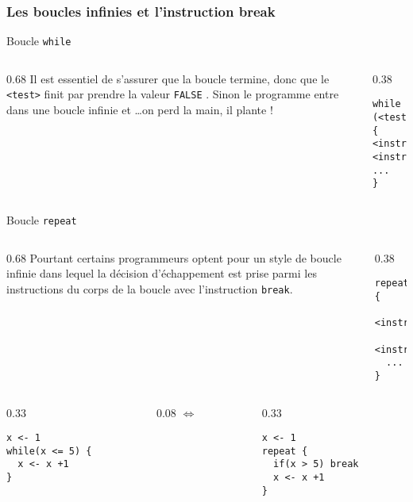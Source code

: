 \documentclass[10pt]{beamer}
\begin{document}
\begin{frame}[fragile]
  \frametitle{Les boucles infinies et l'instruction break}
  
  \begin{block}{Boucle \texttt{while}}
\begin{columns}[c]
\begin{column}{0.68\textwidth}
    Il est essentiel de s'assurer que la boucle termine, donc que le \texttt{<test>} finit par prendre la valeur \texttt{FALSE} .
  Sinon le programme entre dans une \alert{boucle infinie} et \dots on perd la main, il plante !

\end{column}
\begin{column}{0.38\textwidth}
  \begin{lstlisting}[style=editor]
while (<test>) {
<instruction>
<instruction>
...
}    
  \end{lstlisting}
\end{column}
\end{columns}
\end{block}

  \begin{block}{Boucle \texttt{repeat}}
\begin{columns}[c]
\begin{column}{0.68\textwidth}
  Pourtant certains programmeurs optent pour un style de boucle infinie dans lequel la décision d'échappement est prise parmi les instructions du corps de la boucle avec l'instruction \texttt{break}.
\end{column}
\begin{column}{0.38\textwidth}
  \begin{lstlisting}[style=editor]
repeat {
  <instruction>
  <instruction>
  ...
}    
  \end{lstlisting}
\end{column}
\end{columns}

  \end{block}
\begin{columns}[c]
\begin{column}{0.33\textwidth}
  \begin{lstlisting}[style=editor]
x <- 1
while(x <= 5) {
  x <- x +1
}    
\end{lstlisting}
\end{column}
\begin{column}{0.08\textwidth}
  $\Longleftrightarrow$
\end{column}
\begin{column}{0.33\textwidth}
\begin{lstlisting}[style=editor]
x <- 1
repeat {
  if(x > 5) break
  x <- x +1
}  
\end{lstlisting}

\end{column}
\end{columns}

\end{frame}
\end{document}
